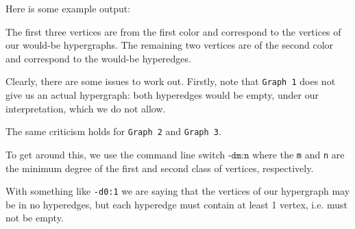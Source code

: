 Here is some example output:




The first three vertices are from the first color and correspond to the vertices of our would-be hypergraphs.
The remaining two vertices are of the second color and correspond to the would-be hyperedges.

Clearly, there are some issues to work out. Firstly, note that \texttt{Graph 1} does not give us an actual hypergraph: both hyperedges would be empty, under our interpretation, which we do not allow.

The same criticism holds for \texttt{Graph 2} and \texttt{Graph 3}.


To get around this, we use the command line switch $\texttt{-dm:n}$ where the \texttt{m} and \texttt{n} are the minimum degree of the first and second class of vertices, respectively.

With something like \texttt{-d0:1} we are saying that the vertices of our hypergraph may be in no hyperedges, but each hyperedge must contain at least 1 vertex, i.e. must not be empty.


